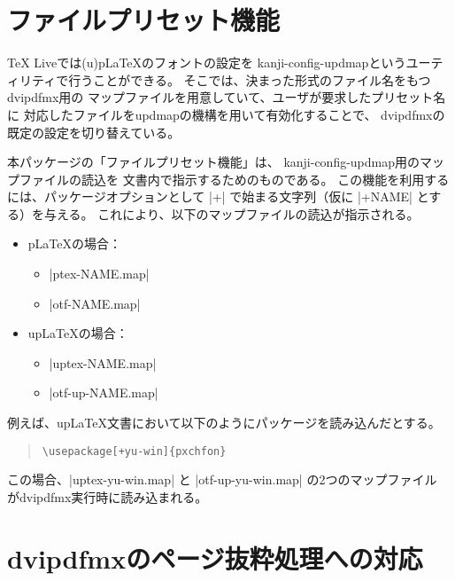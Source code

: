 \documentclass[a4paper,uplatex]{jsarticle}
\providecommand{\pLaTeX}{p\LaTeX}
\providecommand{\upLaTeX}{u\pLaTeX}
\begin{document}
\section{ファイルプリセット機能}
\label{sec:FilePreset}

{\TeX} Liveでは{(u)\pLaTeX}のフォントの設定を
kanji-config-updmapというユーティリティで行うことができる。
そこでは、決まった形式のファイル名をもつdvipdfmx用の
マップファイルを用意していて、ユーザが要求したプリセット名に
対応したファイルをupdmapの機構を用いて有効化することで、
dvipdfmxの既定の設定を切り替えている。

本パッケージの「ファイルプリセット機能」は、
kanji-config-updmap用のマップファイルの読込を
文書内で指示するためのものである。
この機能を利用するには、パッケージオプションとして
|+| で始まる文字列（仮に |+NAME| とする）を与える。
これにより、以下のマップファイルの読込が指示される。

\begin{itemize}
\item {\pLaTeX}の場合：
  \begin{itemize}
  \item |ptex-NAME.map|
  \item |otf-NAME.map|
  \end{itemize}
\item {\upLaTeX}の場合：
  \begin{itemize}
  \item |uptex-NAME.map|
  \item |otf-up-NAME.map|
  \end{itemize}
\end{itemize}

例えば、{\upLaTeX}文書において以下のようにパッケージを読み込んだとする。

\begin{quote}\small\begin{verbatim}
\usepackage[+yu-win]{pxchfon}
\end{verbatim}\end{quote}

この場合、|uptex-yu-win.map| と |otf-up-yu-win.map| の2つのマップファイル
がdvipdfmx実行時に読み込まれる。

\section{dvipdfmxのページ抜粋処理への対応}
\end{document}
